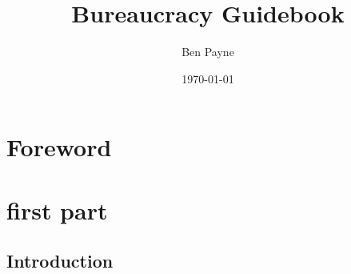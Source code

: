 \documentclass{book}
\title{Bureaucracy Guidebook}
\author{Ben Payne}
\date{\today}
\begin{document}
\frontmatter %

\clearpage

\clearpage

\chapter*{Foreword}%
\clearpage

\maketitle

\tableofcontents

\mainmatter %

\chapter{first part}
\section{Introduction}
\end{document}
